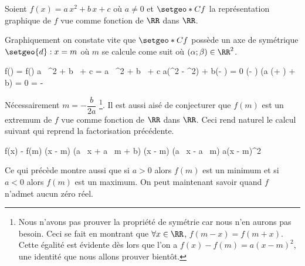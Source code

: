 Soient $f(x) = a \, x^2 + b \, x + c$ où $a \neq 0$ et $\setgeo*{C}{f}$ la représentation graphique de $f$ vue comme fonction de $\RR$ dans $\RR$.

\medskip

Graphiquement on constate vite que $\setgeo*{C}{f}$ possède un axe de symétrique $\setgeo{d}: x = m$ où $m$ se calcule come suit où $(\alpha ; \beta) \in \RR^2$.

\medskip

\begin{explain}[style = sar, ope = \iff] 
	f(\alpha) = f(\beta)
		\explnext{}
	a \, \alpha^2 + b \, \alpha + c = a \, \beta^2 + b \, \beta + c
		\explnext{}
	a(\alpha^2 - \beta^2) + b(\alpha - \beta) = 0
		\explnext{}
	(\alpha - \beta) (a (\alpha + \beta) + b) = 0
		\explnext{}
	 = - 
\end{explain}

\medskip

Nécessairement $m = - \dfrac{b}{2a}$
\footnote{
	Nous n'avons pas prouver la propriété de symétrie car nous n'en aurons pas besoin.
	Ceci se fait en montrant que $\forall x \in \RR$, $f(m- x) = f(m + x)$.
	Cette égalité est évidente dès lors que l'on a $f(x) - f(m) = a(x - m)^2$, une identité que nous allons prouver bientôt.
}.
Il est aussi aisé de conjecturer que $f(m)$ est un extremum de $f$ vue comme fonction de $\RR$ dans $\RR$. Ceci rend naturel le calcul suivant qui reprend la factorisation précédente.

\medskip

\begin{explain}[style = sar] 
	f(x) - f(m)
		\explnext{}
	(x - m) (a \, x + a \, m + b)
	(x - m) (a \, x - a \, m)
		\explnext{}
	a(x - m)^2
\end{explain}

\medskip

Ce qui précède montre aussi que 
si $a > 0$ alors $f(m)$ est un minimum et
si $a < 0$ alors $f(m)$ est un maximum. On peut maintenant savoir quand $f$ n'admet aucun zéro réel.

